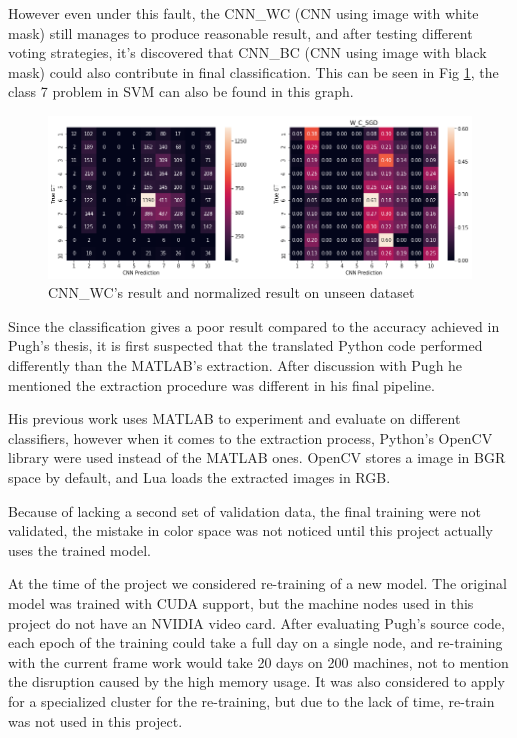 \documentclass[bsc,logo,twoside,fullspacing,parskip]{infthesis}
\begin{document}
However even under this fault, the CNN\_WC (CNN using image with white mask) still manages to produce reasonable result, and after testing different voting strategies, it's discovered that CNN\_BC (CNN using image with black mask) could also contribute in final classification.
This can be seen in Fig \ref{fig:cnnbcacc}, the class 7 problem in SVM can also be found in this graph.

\begin{figure}[h]
\centering
    \includegraphics[scale=0.44]{graph/cnnwc.png}
    \caption{CNN\_WC's result and normalized result on unseen dataset}
    \label{fig:cnnbcacc}
\end{figure} 

Since the classification gives a poor result compared to the accuracy achieved in Pugh's thesis\cite{Pugh}, it is first suspected that the translated Python code performed differently than the MATLAB's extraction.
After discussion with Pugh he mentioned the extraction procedure was different in his final pipeline.

His previous work uses MATLAB to experiment and evaluate on different classifiers, however  when it comes to the extraction process, Python's OpenCV library were used instead of the MATLAB ones.
OpenCV stores a image in BGR space by default, and Lua loads the extracted images in RGB.

Because of lacking a second set of validation data, the final training were not validated, the mistake in color space was not noticed until this project actually uses the trained model.

At the time of the project we considered re-training of a new model. 
The original model was trained with CUDA support, but the machine nodes used in this project do not have an NVIDIA video card. 
After evaluating Pugh's source code, each epoch of the training could take a full day on a single node, and re-training with the current frame work would take 20 days on 200 machines, not to mention the disruption caused by the high memory usage. 
It was also considered to apply for a specialized cluster for the re-training, but due to the lack of time, re-train was not used in this project.
\end{document}
